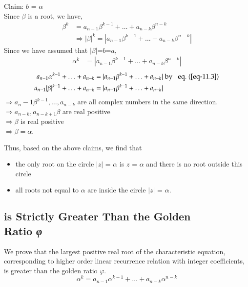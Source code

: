 \begin{multicols}{2}
Claim: $b$ = $\alpha$ \\
Since $\beta$ is a root, we have,
\begin{align}
\beta^k &= a_{n-1}\beta^{k-1} + \ldots + a_{n-k}\beta^{n-k}\nonumber\\
&\Rightarrow |\beta|^k = |a_{n-1}\beta^{k-1} + \ldots + a_{n-k}\beta^{n-k}|\nonumber
\end{align}
Since we have assumed that $|\beta|$=$b$=$a$, 
\begin{align*}
\alpha^k &= |a_{n-1}\beta^{k-1}+ \ldots + a_{n-k}\beta^{n-k}|
\end{align*}
{\fontsize{8}{9}\selectfont\begin{align}
a_{n-1}\alpha^{k-1}+ \ldots + a_{n-k} &=  |a_{n-1}\beta^{k-1}+ \ldots + a_{n-k}| \hspace{0.1cm}\textup{by \hspace{0.1cm} eq.~(\ref{eq-11.3})} \label{eq-11.9}\\
a_{n-1}|\beta|^{k-1}+ \ldots + a_{n-k} &=  |a_{n-1}\beta^{k-1}+ \ldots + a_{n-k}|\label{eq-11.10}
\end{align}}
$\Rightarrow a_n-1\beta^{k-1}, \ldots, a_{n-k}$ are all complex numbers in the same direction. \\
$\Rightarrow a_{n-k}, a_{n-k+1} \beta$ are real positive\\
$\Rightarrow \beta$ is real positive\\
$\Rightarrow \beta = \alpha$.\\

\vspace{-.6cm}

Thus, based on the above claims, we find that 
\begin{itemize}
\item the only root on the circle $|z|$ = $\alpha$ is $z$ = $\alpha$ and there is no root outside this circle
\item all roots not equal to $\alpha$ are inside the circle $|z|$ = $\alpha$.
\end{itemize}

\subsection{\hspace{-.3cm}{\greekfont α} is Strictly Greater Than the Golden\\ Ratio  {\it {\greekfont φ}}}\label{subsection-11.3}
We prove that the largest positive real root of the characteristic equation, corresponding to higher order linear recurrence relation with integer coefficients, is greater than the golden ratio $\varphi$.
$$
\alpha^{k} =  a_{n-1}\alpha^{k-1} + \ldots + a_{n-k}\alpha^{n-k}
$$


\end{multicols}

